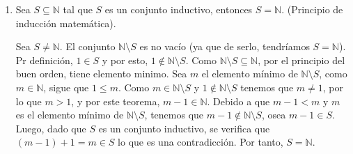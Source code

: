 \documentclass[11pt]{article}
\newcommand{\N}{\mathbb{N}}
\newcommand{\R}{\mathbb{R}}
\let\subset\subseteq
\begin{document}
\begin{enumerate}[label=\alph*)]
\begin{enumerate}[label=\roman*)]

        \item Sea $S\subseteq \N$ tal que $S$ es un conjunto inductivo, entonces $S=\N$. (Principio de inducción matemática).

            Sea $S\neq \N$. El conjunto $\N\setminus S$ es no vacío (ya que de serlo, tendríamos $S=\N$). Pr definición, $1\in S$ y por esto, $1\notin \N\setminus S$. Como $\N\setminus S\subset \N$, por el principio del buen orden, tiene elemento minimo. Sea $m$ el elemento mínimo de $\N\setminus S$, como $m\in \N$, sigue que $1 \leq m$. Como $m\in \N\setminus S$ y $1\notin \N\setminus S$ tenemos que $m\neq 1$, por lo que $m>1$, y por este teorema, $m-1\in \N$. Debido a que $m-1<m$ y $m$ es el elemento mínimo de $\N \setminus S$, tenemos que $m-1\notin \N\setminus S$, osea $m-1\in S$. Luego, dado que $S$ es un conjunto inductivo, se verifica que $(m-1)+1=m\in S$ lo que es una contradicción. Por tanto, $S=\N$.    


\end{enumerate}
\end{enumerate}
\end{document}
